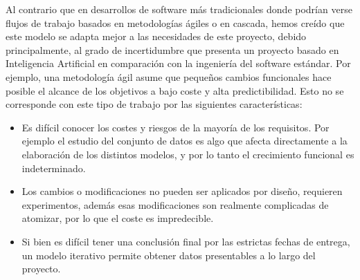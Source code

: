 \documentclass[11pt,a4paper,spanish]{book}
\begin{document}
		Al contrario que en desarrollos de software más tradicionales donde podrían verse flujos de trabajo basados en metodologías ágiles o en cascada, hemos creído que este modelo se adapta mejor a las necesidades de este proyecto, debido principalmente, al grado de incertidumbre que presenta un proyecto basado en Inteligencia Artificial en comparación con la ingeniería del software estándar. Por ejemplo, una metodología ágil asume que pequeños cambios funcionales hace posible el alcance de los objetivos a bajo coste y alta predictibilidad. Esto no se corresponde con este tipo de trabajo por las siguientes características:
		
		\begin{itemize}
			\item Es difícil conocer los costes y riesgos de la mayoría de los requisitos. Por ejemplo el estudio del conjunto de datos es algo que afecta directamente a la elaboración de los distintos modelos, y por lo tanto el crecimiento funcional es indeterminado.  
			
			\item Los cambios o modificaciones no pueden ser aplicados por diseño, requieren experimentos, además esas modificaciones son realmente complicadas de atomizar, por lo que el coste es impredecible. 
			
			\item Si bien es difícil tener una conclusión final por las estrictas fechas de entrega, un modelo iterativo permite obtener datos presentables a lo largo del proyecto.
		\end{itemize}
	
	
		
	
\end{document}
